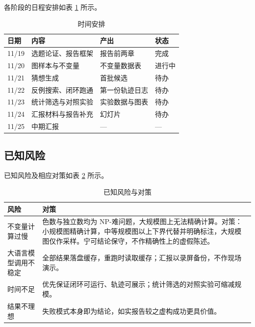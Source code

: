 各阶段的日程安排如表 \ref{tab:schedule} 所示。

\begin{table}[H]
\centering
\small
\caption{时间安排}
\label{tab:schedule}
\begin{tabular}{@{}llp{5.4cm}l@{}}
\toprule
日期 & 内容 & 产出 & 状态 \\
\midrule
11/19 & 选题论证、报告框架 & 报告前两章 & 完成 \\
11/20 & 图样本与不变量 & 不变量数据表 & 进行中 \\
11/21 & 猜想生成 & 首批候选 & 待办 \\
11/22 & 反例搜索、闭环跑通 & 第一份轨迹日志 & 待办 \\
11/23 & 统计筛选与对照实验 & 实验数据与图表 & 待办 \\
11/24 & 汇报材料与报告补充 & 幻灯片 & 待办 \\
11/25 & 中期汇报 & — & — \\
\bottomrule
\end{tabular}
\end{table}

\subsection{已知风险}

已知风险及相应对策如表 \ref{tab:risks} 所示。

\begin{table}[H]
\centering
\footnotesize
\caption{已知风险与对策}
\label{tab:risks}
\begin{tabular}{@{}p{3.9cm}p{10.1cm}@{}}
\toprule
风险 & 对策 \\
\midrule
不变量计算过慢 & 色数与独立数均为 NP-难问题，大规模图上无法精确计算。对策：小规模图精确计算，中等规模图以上下界代替并明确标注，大规模图仅作采样。宁可结论保守，不作精确性上的虚假陈述。 \\
\addlinespace
大语言模型调用不稳定 & 全部结果落盘缓存，重跑时读取缓存；汇报以录屏备份，不作现场演示。 \\
\addlinespace
时间不足 & 优先保证闭环可运行、轨迹可展示；统计筛选的对照实验可缩减规模。 \\
\addlinespace
结果不理想 & 失败模式本身即为结论，如实报告较之虚构成功更具价值。 \\
\bottomrule
\end{tabular}
\end{table}
